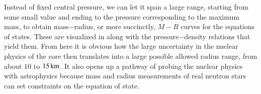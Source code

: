 Instead of fixed central pressure, we can let it span a large range, starting from some small value and ending to the pressure corresponding to the maximum mass, to obtain mass$-$radius, or more succinctly, $M-R$ curves for the equations of states.
These are visualized in  along with the pressure$-$density relations that yield them.
From here it is obvious how the large uncertainty in the nuclear physics of the core then translates into a large possible allowed radius range, from about $10$ to $15\, \mathrm{km}$.
It also opens up a pathway of probing the nuclear physics with astrophysics because  mass and radius measurements of real neutron stars can set constraints on the equation of state.


